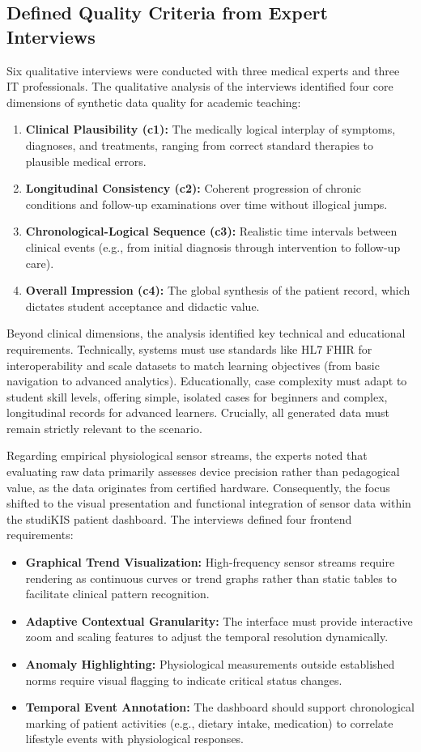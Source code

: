  
\subsection*{Defined Quality Criteria from Expert Interviews}
Six qualitative interviews were conducted with three medical experts and three IT professionals. The qualitative analysis of the interviews identified four core dimensions of synthetic data quality for academic teaching:
\begin{enumerate}
\item \textbf{Clinical Plausibility (c1):} The medically logical interplay of symptoms, diagnoses, and treatments, ranging from correct standard therapies to plausible medical errors.
\item \textbf{Longitudinal Consistency (c2):} Coherent progression of chronic conditions and follow-up examinations over time without illogical jumps.
\item \textbf{Chronological-Logical Sequence (c3):} Realistic time intervals between clinical events (e.g., from initial diagnosis through intervention to follow-up care).
\item \textbf{Overall Impression (c4):} The global synthesis of the patient record, which dictates student acceptance and didactic value.
\end{enumerate}

Beyond clinical dimensions, the analysis identified key technical and educational requirements. Technically, systems must use standards like HL7 FHIR for interoperability and scale datasets to match learning objectives (from basic navigation to advanced analytics). Educationally, case complexity must adapt to student skill levels, offering simple, isolated cases for beginners and complex, longitudinal records for advanced learners. Crucially, all generated data must remain strictly relevant to the scenario.

Regarding empirical physiological sensor streams, the experts noted that evaluating raw data primarily assesses device precision rather than pedagogical value, as the data originates from certified hardware. Consequently, the focus shifted to the visual presentation and functional integration of sensor data within the studiKIS patient dashboard. The interviews defined four frontend requirements:
\begin{itemize}
\item \textbf{Graphical Trend Visualization:} High-frequency sensor streams require rendering as continuous curves or trend graphs rather than static tables to facilitate clinical pattern recognition.
\item \textbf{Adaptive Contextual Granularity:} The interface must provide interactive zoom and scaling features to adjust the temporal resolution dynamically.
\item \textbf{Anomaly Highlighting:} Physiological measurements outside established norms require visual flagging to indicate critical status changes.
\item \textbf{Temporal Event Annotation:} The dashboard should support chronological marking of patient activities (e.g., dietary intake, medication) to correlate lifestyle events with physiological responses.
\end{itemize}

